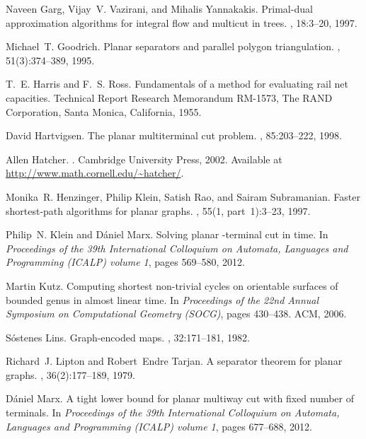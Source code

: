 \documentclass[11pt]{article}
\theoremstyle{plain}  \newtheorem{theorem}{Theorem}[section]
\theoremstyle{definition}
\begin{document}
\begin{thebibliography}{10}
Naveen Garg, Vijay~V. Vazirani, and Mihalis Yannakakis.
\newblock Primal-dual approximation algorithms for integral flow and multicut
  in trees.
, 18:3--20, 1997.

Michael~T. Goodrich.
\newblock Planar separators and parallel polygon triangulation.
, 51(3):374--389, 1995.

T.~E. Harris and F.~S. Ross.
\newblock Fundamentals of a method for evaluating rail net capacities.
\newblock Technical Report Research Memorandum RM-1573, The RAND Corporation,
  Santa Monica, California, 1955.

David Hartvigsen.
\newblock The planar multiterminal cut problem.
, 85:203--222, 1998.

Allen Hatcher.
.
\newblock Cambridge University Press, 2002.
\newblock Available at \url{http://www.math.cornell.edu/~hatcher/}.

Monika~R. Henzinger, {\relax Ph}ilip Klein, Satish Rao, and Sairam Subramanian.
\newblock Faster shortest-path algorithms for planar graphs.
, 55(1, part~1):3--23,
  1997.

{\relax Ph}ilip~N. Klein and D{\'a}niel Marx.
\newblock Solving {\sc planar -terminal cut} in  time.
\newblock In {\em Proceedings of the 39th International Colloquium on Automata,
  Languages and Programming (ICALP) volume 1}, pages 569--580, 2012.

Martin Kutz.
\newblock Computing shortest non-trivial cycles on orientable surfaces of
  bounded genus in almost linear time.
\newblock In {\em Proceedings of the 22nd Annual Symposium on Computational
  Geometry (SOCG)}, pages 430--438. ACM, 2006.

S{\'o}stenes Lins.
\newblock Graph-encoded maps.
, 32:171--181, 1982.

Richard~J. Lipton and Robert~Endre Tarjan.
\newblock A separator theorem for planar graphs.
, 36(2):177--189, 1979.

D{\'a}niel Marx.
\newblock A tight lower bound for planar multiway cut with fixed number of
  terminals.
\newblock In {\em Proceedings of the 39th International Colloquium on Automata,
  Languages and Programming (ICALP) volume 1}, pages 677--688, 2012.


\end{thebibliography}
\end{document}
